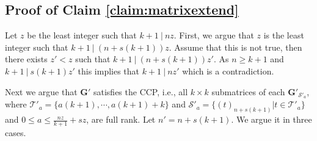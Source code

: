 \documentclass[journal,twocolumn]{IEEEtran}
\theoremstyle{definition}
\newcommand{\calS}{\mathcal{S}}
\newcommand{\calT}{\mathcal{T}}
\newcommand{\bfG}{\mathbf{G}}
\newcommand{\aditya}[1]{\marginpar{+}{\bf Aditya's remark}: {\em #1}}
\begin{document}
\subsection*{Proof of Claim \ref{claim:matrixextend}}
Let $z$ be the least integer such that $k+1~|~nz$. First, we argue that $z$ is the least integer such that $k+1~|~(n+s(k+1))z$. Assume that this is not true, then there exists $z'<z$ such that $k+1~|~(n+s(k+1))z'$. As $n\ge k+1$ and $k+1~|~s(k+1)z'$ this implies that $k+1~|~nz'$ which is a contradiction.

Next we argue that $\bfG'$ satisfies the CCP, i.e., all $k \times k$ submatrices of each $\bfG'_{\calS'_a}$, where $\calT'_a=\{a(k+1),\cdots, a(k+1)+k\}$ and $\calS'_a=\{(t)_{n+s(k+1)}|t\in \calT'_a\}$ and $0\le a\le \frac{nz}{k+1}+sz$, are full rank. Let $n'= n+s(k+1)$. We argue it in three cases.
\end{document}
